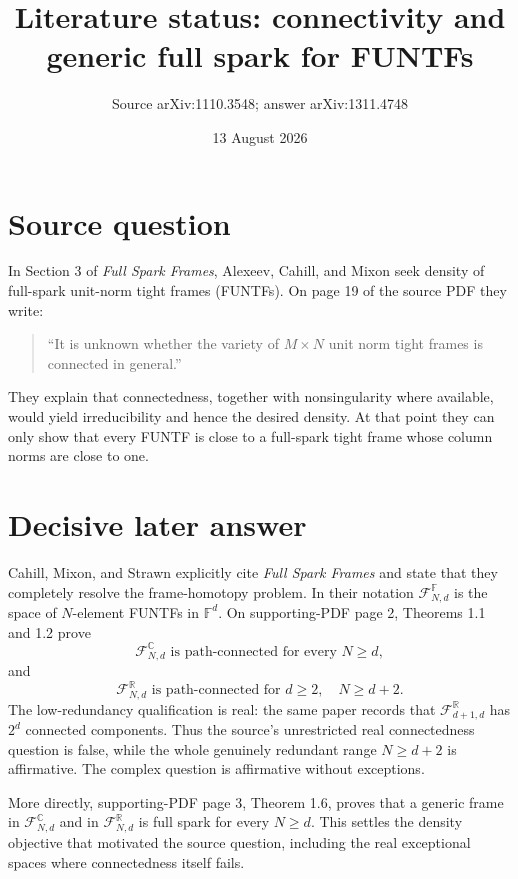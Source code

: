 \documentclass[11pt]{article}
\title{Literature status: connectivity and generic full spark for FUNTFs}
\author{Source arXiv:1110.3548; answer arXiv:1311.4748}
\date{13 August 2026}
\begin{document}
\maketitle

\begin{center}
\end{center}

\section*{Source question}

In Section 3 of \emph{Full Spark Frames}, Alexeev, Cahill, and Mixon
\cite{ACM} seek density of full-spark unit-norm tight frames (FUNTFs).  On
page 19 of the source PDF they write:
\begin{quote}
``It is unknown whether the variety of $M\times N$ unit norm tight frames is
connected in general.''
\end{quote}
They explain that connectedness, together with nonsingularity where
available, would yield irreducibility and hence the desired density.  At that
point they can only show that every FUNTF is close to a full-spark tight frame
whose column norms are close to one.

\section*{Decisive later answer}

Cahill, Mixon, and Strawn \cite{CMS} explicitly cite \emph{Full Spark Frames}
and state that they completely resolve the frame-homotopy problem.  In their
notation $\mathcal F^{\mathbb F}_{N,d}$ is the space of $N$-element FUNTFs in
$\mathbb F^d$.  On supporting-PDF page 2, Theorems 1.1 and 1.2 prove
\[
 \mathcal F^{\mathbb C}_{N,d}\text{ is path-connected for every }N\ge d,
\]
and
\[
 \mathcal F^{\mathbb R}_{N,d}\text{ is path-connected for }
 d\ge2,\quad N\ge d+2.
\]
The low-redundancy qualification is real: the same paper records that
$\mathcal F^{\mathbb R}_{d+1,d}$ has $2^d$ connected components.  Thus the
source's unrestricted real connectedness question is false, while the whole
genuinely redundant range $N\ge d+2$ is affirmative.  The complex question
is affirmative without exceptions.

More directly, supporting-PDF page 3, Theorem 1.6, proves that a generic frame
in $\mathcal F^{\mathbb C}_{N,d}$ and in
$\mathcal F^{\mathbb R}_{N,d}$ is full spark for every $N\ge d$.  This settles
the density objective that motivated the source question, including the real
exceptional spaces where connectedness itself fails.
\end{document}
